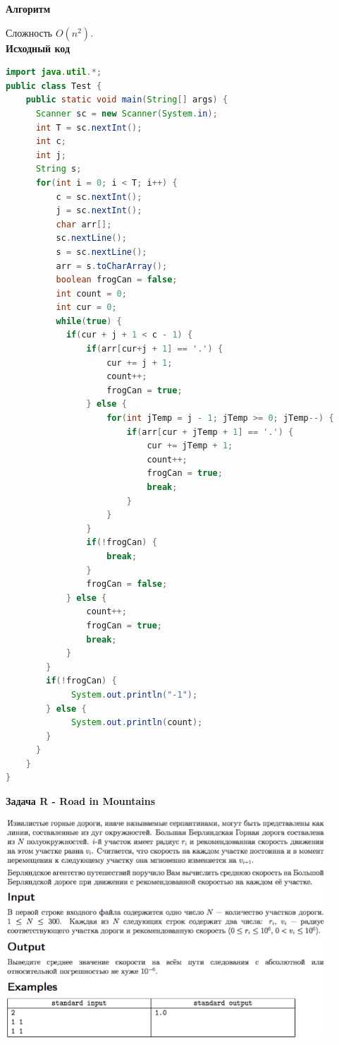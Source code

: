 \documentclass[a4paper,12pt]{article}
\begin{document}
\textbf{{\large Алгоритм}}

Сложность $O(n^2)$. \\
\newpage
\textbf{{\large Исходный код}} \\
\begin{lstlisting}[language=Java]
import java.util.*;
public class Test {
    public static void main(String[] args) {        
      Scanner sc = new Scanner(System.in);
      int T = sc.nextInt();
      int c;
      int j;
      String s;      
      for(int i = 0; i < T; i++) {
          c = sc.nextInt();
          j = sc.nextInt();          
          char arr[];
          sc.nextLine();
          s = sc.nextLine();
          arr = s.toCharArray();
          boolean frogCan = false;
          int count = 0;
          int cur = 0;
          while(true) {
            if(cur + j + 1 < c - 1) {
                if(arr[cur+j + 1] == '.') {
                    cur += j + 1;
                    count++;
                    frogCan = true;
                } else {
                    for(int jTemp = j - 1; jTemp >= 0; jTemp--) {
                        if(arr[cur + jTemp + 1] == '.') {
                            cur += jTemp + 1;
                            count++;
                            frogCan = true;
                            break;
                        }
                    }
                }
                if(!frogCan) {
                    break;
                }
                frogCan = false;
            } else {
                count++;
                frogCan = true;
                break;
            }
        }
        if(!frogCan) {
             System.out.println("-1");
        } else {
             System.out.println(count);
        }           
      }    
    }
}
\end{lstlisting}



\newpage
\textbf{{\large Задача R - Road in Mountains}}

\begin{center}
\includegraphics[width=0.9\textwidth]{OC_Bashkortostan/R.png}\\ [1cm]
\end{center}
\end{document}
